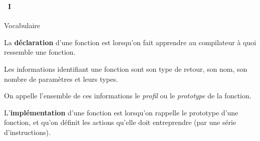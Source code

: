 \begin{frame}
  \frametitle{\secname}
  \framesubtitle{\subsecname~I}  
  \begin{block}{Vocabulaire}
    \par
    La \textbf{déclaration} d'une fonction est lorsqu'on fait apprendre au compilateur à quoi ressemble une fonction.
    \vspace{0.3cm}
    \par
    Les informations identifiant une fonction sont son type de retour, son nom, son nombre de paramètres et leurs types.
    \vspace{0.3cm}
    \par
    On appelle l'ensemble de ces informations le \emph{profil} ou le \emph{prototype} de la fonction.
    \vspace{0.3cm}
    \par
    L'\textbf{implémentation} d'une fonction est lorsqu'on rappelle le prototype d'une fonction, et qu'on définit les actions qu'elle doit entreprendre (par une série d'instructions).
  \end{block}
\end{frame}

